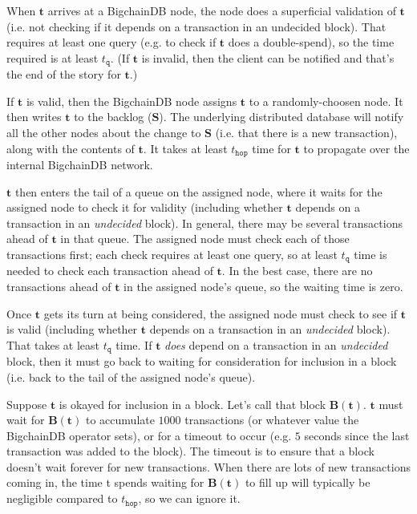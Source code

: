 When $\mathbf{t}$ arrives at a BigchainDB node, the node does a superficial validation of $\mathbf{t}$ (i.e. not checking if it depends on a transaction in an undecided block). 
That requires at least one query (e.g. to check if $\mathbf{t}$ does a double-spend), so the time required is at least $t_\mathtt{q}$. 
(If $\mathbf{t}$ is invalid, then the client can be notified and that’s the end of the story for $\mathbf{t}$.)

If $\mathbf{t}$ is valid, then the BigchainDB node assigns $\mathbf{t}$ to a randomly-choosen node. 
It then writes $\mathbf{t}$ to the backlog ($\mathbf{S}$). 
The underlying distributed database will notify all the other nodes about the change to $\mathbf{S}$ (i.e. that there is a new transaction), along with the contents of $\mathbf{t}$. 
It takes at least $t_\mathtt{hop}$ time for $\mathbf{t}$ to propagate over the internal BigchainDB network.

$\mathbf{t}$ then enters the tail of a queue on the assigned node, where it waits for the assigned node to check it for validity (including whether $\mathbf{t}$ depends on a transaction in an \textsf{\textit{undecided}} block). 
In general, there may be several transactions ahead of $\mathbf{t}$ in that queue. 
The assigned node must check each of those transactions first; each check requires at least one query, so at least $t_\mathtt{q}$ time is needed to check each transaction ahead of $\mathbf{t}$. 
In the best case, there are no transactions ahead of $\mathbf{t}$ in the assigned node’s queue, so the waiting time is zero.

Once $\mathbf{t}$ gets its turn at being considered, the assigned node must check to see if $\mathbf{t}$ is valid (including whether $\mathbf{t}$ depends on a transaction in an \textsf{\textit{undecided}} block). 
That takes at least $t_\mathtt{q}$ time. 
If $\mathbf{t}$ \textit{does} depend on a transaction in an \textsf{\textit{undecided}} block, then it must go back to waiting for consideration for inclusion in a block (i.e. back to the tail of the assigned node’s queue).

Suppose $\mathbf{t}$ is okayed for inclusion in a block. 
Let’s call that block $\mathbf{B}(\mathbf{t})$. 
$\mathbf{t}$ must wait for $\mathbf{B}(\mathbf{t})$ to accumulate $1000$ transactions (or whatever value the BigchainDB operator sets), or for a timeout to occur (e.g. $5$ seconds since the last transaction was added to the block). 
The timeout is to ensure that a block doesn’t wait forever for new transactions. 
When there are lots of new transactions coming in, the time t spends waiting for $\mathbf{B}(\mathbf{t})$ to fill up will typically be negligible compared to $t_\mathtt{hop}$, so we can ignore it.

